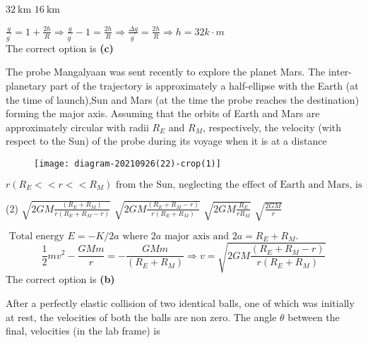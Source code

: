 \begin{enumerate}
\begin{tasks}
	\task[\textbf{C.}]$32 \mathrm{~km}$
	\task[\textbf{D.}]$16 \mathrm{~km}$
\end{tasks}
\begin{answer}
$\frac{g}{g^{\prime}}=1+\frac{2 h}{R} \Rightarrow \frac{g}{g^{\prime}}-1=\frac{2 h}{R} \Rightarrow \frac{\Delta g}{g^{\prime}}=\frac{2 h}{R} \Rightarrow h=32 k \cdot m$\\
The correct option is \textbf{(c)}	
\end{answer}
\begin{minipage}{\textwidth}
	\item The probe Mangalyaan was sent recently to explore the planet Mars. The inter-planetary part of the trajectory is approximately a half-ellipse with the Earth (at the time of launch),Sun and Mars (at the time the probe reaches the destination) forming the major axis. Assuming that the orbits of Earth and Mars are approximately circular with radii $R_{E}$ and $R_{M}$, respectively, the velocity (with respect to the Sun) of the probe during its voyage when it is at a distance
		\begin{figure}[H]
		\centering
		\texttt{[image: diagram-20210926(22)-crop(1)]}
	\end{figure}
	 $r\left(R_{E}<<r<<R_{M}\right) \text { from the Sun, neglecting the effect of Earth and Mars, is }$
\end{minipage}
\begin{tasks}(2)
	\task[\textbf{A.}] $\sqrt{2 G M \frac{\left(R_{E}+R_{M}\right)}{r\left(R_{E}+R_{M}-r\right)}}$
	\task[\textbf{B.}]$\sqrt{2 G M \frac{\left(R_{E}+R_{M}-r\right)}{r\left(R_{E}+R_{M}\right)}}$
	\task[\textbf{C.}]$\sqrt{2 G M \frac{R_{E}}{r R_{M}}}$
	\task[\textbf{D.}]$\sqrt{\frac{2 G M}{r}}$
\end{tasks}
\begin{answer}
	$\text { Total energy } E=-K / 2 a \text { where } 2 a \text { major axis and } 2 a=R_{E}+R_{M} \text {. }$
	$$\frac{1}{2} m v^{2}-\frac{G M m}{r}=-\frac{G M m}{\left(R_{E}+R_{M}\right)} \Rightarrow v=\sqrt{2 G M \frac{\left(R_{E}+R_{M}-r\right)}{r\left(R_{E}+R_{M}\right)}}$$
	The correct option is \textbf{(b)}
\end{answer}
\begin{minipage}{\textwidth}
	\item After a perfectly elastic collision of two identical balls, one of which was initially at rest, the velocities of both the balls are non zero. The angle $\theta$ between the final, velocities (in the lab frame) is

\end{minipage}
\end{enumerate}
